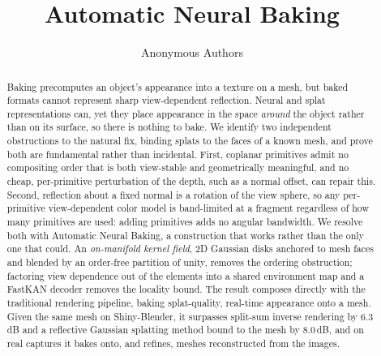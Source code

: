 \documentclass{article} %
\title{Automatic Neural Baking}
\author{Anonymous Authors}
\newcommand{\addtext}[1]{{\color{addcolor}#1}}
\begin{document}
\maketitle


\begin{abstract}
Baking precomputes an object's appearance into a texture on a mesh, but baked formats cannot
represent sharp view-dependent reflection. Neural and splat representations can, yet they place
appearance in the space \emph{around} the object rather than on its surface, so there is nothing to
bake. We identify two independent obstructions to the natural fix, binding splats to the faces of a
known mesh, and prove both are fundamental rather than incidental. First, coplanar primitives admit
no compositing order that is both view-stable and geometrically meaningful, and no cheap,
per-primitive perturbation of the depth, such as a normal offset, can repair this. Second,
reflection about a fixed normal is a rotation of the view sphere, so any per-primitive
view-dependent color model is band-limited at a fragment regardless of how many primitives are
used: adding primitives adds no angular bandwidth. We resolve both with Automatic Neural Baking, a construction that works rather than the only one
that could. An \emph{on-manifold kernel field}, 2D Gaussian disks anchored to mesh faces and
blended by an order-free partition of unity, removes the ordering obstruction; factoring view
dependence out of the elements into a shared environment map and a FastKAN decoder removes the
locality bound. The result composes directly with the traditional rendering pipeline, baking
splat-quality, real-time appearance onto a mesh. \addtext{Given the same mesh on Shiny-Blender, it surpasses
split-sum inverse rendering by 6.3\,dB and a reflective Gaussian splatting method bound to the mesh
by 8.0\,dB, and on real captures it bakes onto, and refines, meshes reconstructed from the images.}
\end{abstract}










\newpage
\appendix

\end{document}
